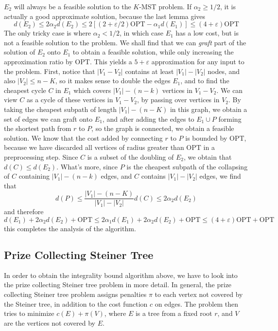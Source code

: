 \documentclass{article}
\theoremstyle{plain}
\begin{document}
$E_2$ will always be a feasible solution to the $K$-MST problem. If $\alpha_2 \geq 1/2$, it is actually a good approximate solution, because the last lemma gives
%
\[ d(E_2) \leq 2 \alpha_2 d(E_2) \leq 2[(2 + \varepsilon/2) \text{OPT} - \alpha_1 d(E_1)] \leq (4 + \varepsilon) \text{OPT} \]
%
The only tricky case is where $\alpha_2 < 1/2$, in which case $E_1$ has a low cost, but is not a feasible solution to the problem. We shall find that we can {\it graft} part of the solution of $E_2$ onto $E_1$ to obtain a feasible solution, while only increasing the approximation ratio by $\text{OPT}$. This yields a $5 + \varepsilon$ approximation for any input to the problem. First, notice that $|V_1 - V_2|$ contains at least $|V_1| - |V_2|$ nodes, and also $|V_2| \leq n-K$, so it makes sense to double the edges $E_1$, and to find the cheapest cycle $C$ in $E_1$ which covers $|V_1| - (n-k)$ vertices in $V_1 - V_2$. We can view $C$ as a cycle of these vertices in $V_1 - V_2$, by passing over vertices in $V_2$. By taking the cheapest subpath of length $|V_1| - (n-K)$ in this graph, we obtain a set of edges we can graft onto $E_1$, and after adding the edges to $E_1 \cup P$ forming the shortest path from $r$ to $P$, so the graph is connected, we obtain a feasible solution. We know that the cost added by connecting $r$ to $P$ is bounded by $\text{OPT}$, because we have discarded all vertices of radius greater than $\text{OPT}$ in a preprocessing step. Since $C$ is a subset of the doubling of $E_2$, we obtain that $d(C) \leq d(E_2)$. What's more, since $P$ is the cheapest subpath of the collapsing of $C$ containing $|V_1| - (n-k)$ edges, and $C$ contains $|V_1| - |V_2|$ edges, we find that
%
\[ d(P) \leq \frac{|V_1| - (n-K)}{|V_1| - |V_2|} d(C) \leq 2\alpha_2 d(E_2) \]
%
and therefore
%
\[ d(E_1) + 2 \alpha_2 d(E_2) + \text{OPT} \leq 2\alpha_1 d(E_1) + 2\alpha_2 d(E_2) + \text{OPT} \leq (4 + \varepsilon) \text{OPT} + \text{OPT} \]
%
this completes the analysis of the algorithm.

\subsection{Prize Collecting Steiner Tree}

In order to obtain the integrality bound algorithm above, we have to look into the prize collecting Steiner tree problem in more detail. In general, the prize collecting Steiner tree problem assigns penalties $\pi$ to each vertex not covered by the Steiner tree, in addition to the cost function $c$ on edges. The problem then tries to minimize $c(E) + \pi(V)$, where $E$ is a tree from a fixed root $r$, and $V$ are the vertices not covered by $E$.
\end{document}
